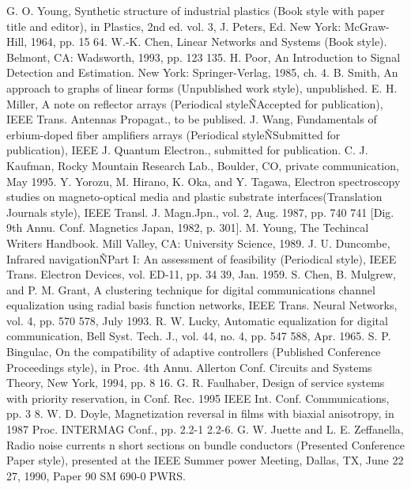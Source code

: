 \documentclass[letterpaper, 10 pt, conference]{ieeeconf}  %
\begin{document}
\begin{thebibliography}{99}
 G. O. Young,  Synthetic structure of industrial plastics (Book style with paper title and editor),  	in Plastics, 2nd ed. vol. 3, J. Peters, Ed.  New York: McGraw-Hill, 1964, pp. 15 64.
 W.-K. Chen, Linear Networks and Systems (Book style).	Belmont, CA: Wadsworth, 1993, pp. 123 135.
 H. Poor, An Introduction to Signal Detection and Estimation.   New York: Springer-Verlag, 1985, ch. 4.
 B. Smith,  An approach to graphs of linear forms (Unpublished work style),  unpublished.
 E. H. Miller,  A note on reflector arrays (Periodical styleÑAccepted for publication),  IEEE Trans. Antennas Propagat., to be publised.
 J. Wang,  Fundamentals of erbium-doped fiber amplifiers arrays (Periodical styleÑSubmitted for publication),  IEEE J. Quantum Electron., submitted for publication.
 C. J. Kaufman, Rocky Mountain Research Lab., Boulder, CO, private communication, May 1995.
 Y. Yorozu, M. Hirano, K. Oka, and Y. Tagawa,  Electron spectroscopy studies on magneto-optical media and plastic substrate interfaces(Translation Journals style),  IEEE Transl. J. Magn.Jpn., vol. 2, Aug. 1987, pp. 740 741 [Dig. 9th Annu. Conf. Magnetics Japan, 1982, p. 301].
 M. Young, The Techincal Writers Handbook.  Mill Valley, CA: University Science, 1989.
 J. U. Duncombe,  Infrared navigationÑPart I: An assessment of feasibility (Periodical style),  IEEE Trans. Electron Devices, vol. ED-11, pp. 34 39, Jan. 1959.
 S. Chen, B. Mulgrew, and P. M. Grant,  A clustering technique for digital communications channel equalization using radial basis function networks,  IEEE Trans. Neural Networks, vol. 4, pp. 570 578, July 1993.
 R. W. Lucky,  Automatic equalization for digital communication,  Bell Syst. Tech. J., vol. 44, no. 4, pp. 547 588, Apr. 1965.
 S. P. Bingulac,  On the compatibility of adaptive controllers (Published Conference Proceedings style),  in Proc. 4th Annu. Allerton Conf. Circuits and Systems Theory, New York, 1994, pp. 8 16.
 G. R. Faulhaber,  Design of service systems with priority reservation,  in Conf. Rec. 1995 IEEE Int. Conf. Communications, pp. 3 8.
 W. D. Doyle,  Magnetization reversal in films with biaxial anisotropy,  in 1987 Proc. INTERMAG Conf., pp. 2.2-1 2.2-6.
 G. W. Juette and L. E. Zeffanella,  Radio noise currents n short sections on bundle conductors (Presented Conference Paper style),  presented at the IEEE Summer power Meeting, Dallas, TX, June 22 27, 1990, Paper 90 SM 690-0 PWRS.

\end{thebibliography}
\end{document}
